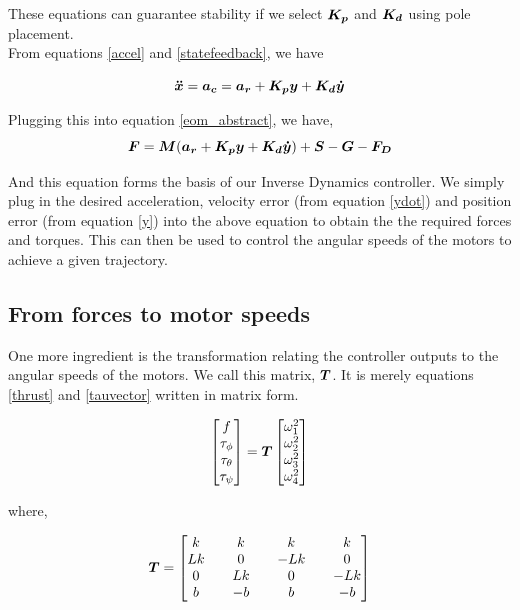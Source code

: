 \documentclass[12pt,fleqn]{article}
\newcommand{\mbm}[1]{\mbox{\boldmath $#1$}}
\begin{document}
These equations can guarantee stability if we select $\mbm{K_p}$ and
$\mbm{K_d}$ using pole placement.\\

From equations \ref{accel} and \ref{statefeedback}, we have

$$ \mbm{\ddot{x}} = \mbm{a_c} = \mbm{a_r} + \mbm{K_p}\mbm{y} +
\mbm{K_d}\mbm{\dot{y}} $$

Plugging this into equation \ref{eom_abstract}, we have,
\begin{equation} \label{eom_id}
$$ \mbm{F} = \mbm{M}(\mbm{a_r} + \mbm{K_p}\mbm{y} +
\mbm{K_d}\mbm{\dot{y}}) + \mbm{S} -\mbm{G} - \mbm{F_D} $$
\end{equation}

And this equation forms the basis of our Inverse Dynamics
controller. We simply plug in the desired acceleration, velocity error
(from equation \ref{ydot}) and position error (from
equation \ref{y}) into the above equation to obtain the the required
forces and torques. This can then be used to control the angular
speeds of the motors to achieve a given trajectory. \\ 

\subsection{From forces to motor speeds}

One more ingredient is the transformation relating the controller
outputs to the angular speeds of the motors. We call this matrix,
$\mbm{T}$. It is merely equations \ref{thrust} and \ref{tauvector} written in
matrix form.

\begin{equation} \label{force_to_omega}
$$ \begin{bmatrix} f \\ \tau_\phi \\ \tau_\theta \\
  \tau_\psi \end{bmatrix}  = \mbm{T} \begin{bmatrix} \omega_1^2 \\
  \omega_2^2 \\ \omega_3^2 \\ \omega_4^2 \end{bmatrix}$$
\end{equation}

where, 

$$ \mbm{T} = \begin{bmatrix}
k && k && k && k \\ 
Lk && 0 && -Lk && 0 \\
0 && Lk && 0 && -Lk \\
b && -b && b && -b \end{bmatrix} $$
\end{document}
